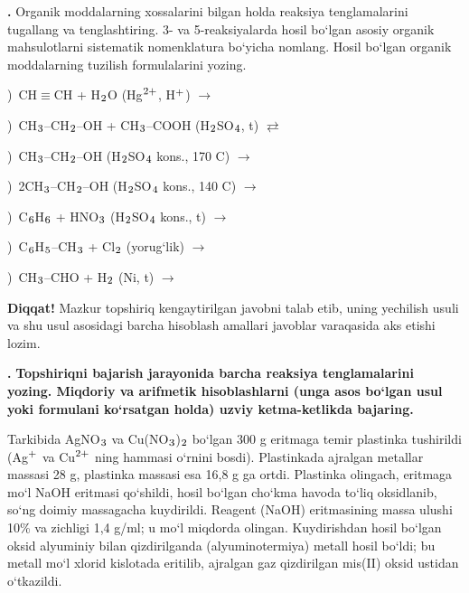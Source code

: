 \documentclass[11pt,a4paper]{article}
\renewcommand{\textsubscript}[1]{\ensuremath{_{\text{\fontsize{8}{8}\selectfont #1}}}}
\renewcommand{\textsuperscript}[1]{\ensuremath{^{\text{\fontsize{8}{8}\selectfont #1}}}}
\newcommand{\qn}[1]{\textbf{\fontsize{11.5}{13}\selectfont #1}}
\newcommand{\qsep}{\par\vspace{13pt}}
\newcommand{\diqqat}[1]{\par\smallskip\noindent\textbf{Diqqat!} #1\par\medskip}
\begin{document}
\noindent\qn{42.} Organik moddalarning xossalarini bilgan holda reaksiya tenglamalarini tugallang va tenglashtiring. 3- va 5-reaksiyalarda hosil bo`lgan asosiy organik mahsulotlarni sistematik nomenklatura bo`yicha nomlang. Hosil bo`lgan organik moddalarning tuzilish formulalarini yozing.\par
{})\ CH$\equiv$CH + H\textsubscript{2}O (Hg\textsuperscript{2+}, H\textsuperscript{+}) $\to$\par
{})\ CH\textsubscript{3}--CH\textsubscript{2}--OH + CH\textsubscript{3}--COOH (H\textsubscript{2}SO\textsubscript{4}, t) $\rightleftarrows$\par
{})\ CH\textsubscript{3}--CH\textsubscript{2}--OH (H\textsubscript{2}SO\textsubscript{4} kons., 170 \textdegree{}C) $\to$\par
{})\ 2CH\textsubscript{3}--CH\textsubscript{2}--OH (H\textsubscript{2}SO\textsubscript{4} kons., 140 \textdegree{}C) $\to$\par
{})\ C\textsubscript{6}H\textsubscript{6} + HNO\textsubscript{3} (H\textsubscript{2}SO\textsubscript{4} kons., t) $\to$\par
{})\ C\textsubscript{6}H\textsubscript{5}--CH\textsubscript{3} + Cl\textsubscript{2} (yorug`lik) $\to$\par
{})\ CH\textsubscript{3}--CHO + H\textsubscript{2} (Ni, t) $\to$\par
\diqqat{Mazkur topshiriq kengaytirilgan javobni talab etib, uning yechilish usuli va shu usul asosidagi barcha hisoblash amallari javoblar varaqasida aks etishi lozim.}\qsep
\noindent\qn{43.} \textbf{Topshiriqni bajarish jarayonida barcha reaksiya tenglamalarini yozing. Miqdoriy va arifmetik hisoblashlarni (unga asos bo`lgan usul yoki formulani ko`rsatgan holda) uzviy ketma-ketlikda bajaring.}\par\smallskip
Tarkibida AgNO\textsubscript{3} va Cu(NO\textsubscript{3})\textsubscript{2} bo`lgan 300 g eritmaga temir plastinka tushirildi (Ag\textsuperscript{+} va Cu\textsuperscript{2+} ning hammasi o`rnini bosdi). Plastinkada ajralgan metallar massasi 28 g, plastinka massasi esa 16,8 g ga ortdi. Plastinka olingach, eritmaga mo`l NaOH eritmasi qo`shildi, hosil bo`lgan cho`kma havoda to`liq oksidlanib, so`ng doimiy massagacha kuydirildi. Reagent (NaOH) eritmasining massa ulushi 10\% va zichligi 1,4 g/ml; u mo`l miqdorda olingan. Kuydirishdan hosil bo`lgan oksid alyuminiy bilan qizdirilganda (alyuminotermiya) metall hosil bo`ldi; bu metall mo`l xlorid kislotada eritilib, ajralgan gaz qizdirilgan mis(II) oksid ustidan o`tkazildi.\par
\end{document}
